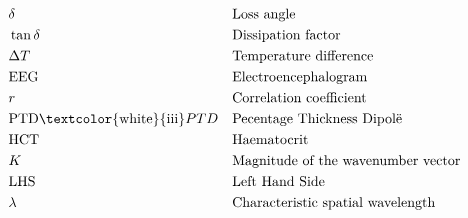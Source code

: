 \pagebreak
\begin{align*}
	&\delta &&\text{Loss angle}\\
	&\tan \delta &&\text{Dissipation factor}\\
	&\Delta T &&\text{Temperature difference}\\
	&\text{EEG} &&\text{Electroencephalogram}\\
	&r &&\text{Correlation coefficient}\\
	&\text{PTD} \text{\textcolor{white}{iii}} PTD &&\text{Pecentage Thickness Dipol\"e}\\
	&\text{HCT} &&\text{Haematocrit}\\
	&K &&\text{Magnitude of the wavenumber vector}\\
	&\text{LHS} &&\text{Left Hand Side}\\
	&\lambda &&\text{Characteristic spatial wavelength}\\
\end{align*}

